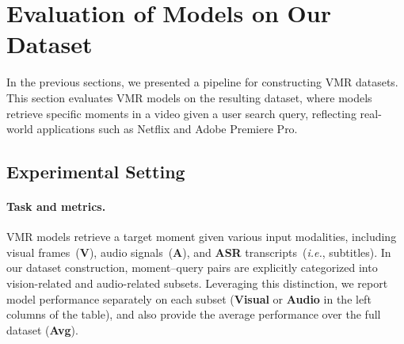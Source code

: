 \documentclass[11pt]{article}
\newcommand{\ie}{\emph{i.e.}}
\begin{document}





\section{Evaluation of Models on Our Dataset}
In the previous sections, we presented a pipeline for constructing VMR datasets. This section evaluates VMR models on the resulting dataset, where models retrieve specific moments in a video given a user search query, reflecting real-world applications such as Netflix and Adobe Premiere Pro.

\subsection{Experimental Setting}
\paragraph{Task and metrics.}
VMR models retrieve a target moment given various input modalities, including visual frames~(\textbf{V}), audio signals~(\textbf{A}), and \textbf{ASR} transcripts~(\ie, subtitles).
In our dataset construction, moment–query pairs are explicitly categorized into vision-related and audio-related subsets. Leveraging this distinction, we report model performance separately on each subset (\textbf{Visual} or \textbf{Audio} in the left columns of the table), and also provide the average performance over the full dataset (\textbf{Avg}).

\end{document}
